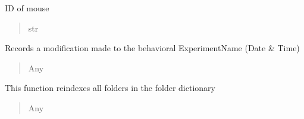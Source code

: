 \documentclass[letterpaper,10pt,english]{sphinxmanual}
\begin{document}
\begin{fulllineitems}

\begin{fulllineitems}
\label{\detokenize{Organization:Organization.Experiment.mouse_id}}
\pysigstartsignatures
{}
\pysigstopsignatures
\sphinxAtStartPar
ID of mouse
\begin{quote}\begin{description}
\sphinxAtStartPar
str

\end{description}\end{quote}

\end{fulllineitems}


\begin{fulllineitems}
\label{\detokenize{Organization:Organization.Experiment.record_mod}}
\pysigstartsignatures
{}
\pysigstopsignatures
\sphinxAtStartPar
Records a modification made to the behavioral ExperimentName (Date \& Time)
\begin{quote}\begin{description}
\sphinxAtStartPar
Any

\end{description}\end{quote}

\end{fulllineitems}


\begin{fulllineitems}
\label{\detokenize{Organization:Organization.Experiment.update_folder_dictionary}}
\pysigstartsignatures
{}
\pysigstopsignatures
\sphinxAtStartPar
This function re\sphinxhyphen{}indexes all folders in the folder dictionary
\begin{quote}\begin{description}
\sphinxAtStartPar
Any

\end{description}\end{quote}

\end{fulllineitems}


\end{fulllineitems}
\end{document}
